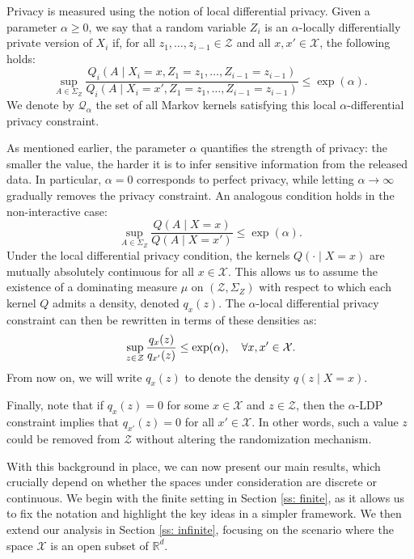 \documentclass[a4paper, 11pt]{article}
\theoremstyle{definition}
\begin{document}
{Privacy is measured using the notion of local differential privacy. Given a parameter $\alpha \ge 0$, we say that a random variable $Z_i$ is an $\alpha$-locally differentially private version of $X_i$ if, for all $z_1, \dots, z_{i-1} \in \mathcal{Z}$ and all $x, x' \in \mathcal{X}$, the following holds:
$$
\sup_{A \in \Sigma_Z} \frac{Q_i(A \mid X_i = x, Z_1 = z_1, \dots, Z_{i-1} = z_{i-1})}{Q_i(A \mid X_i = x', Z_1 = z_1, \dots, Z_{i-1} = z_{i-1})} \le \exp(\alpha).
$$
We denote by $\mathcal{Q}_\alpha$ the set of all Markov kernels satisfying this local $\alpha$-differential privacy constraint.

As mentioned earlier, the parameter $\alpha$ quantifies the strength of privacy: the smaller the value, the harder it is to infer sensitive information from the released data. In particular, $\alpha = 0$ corresponds to perfect privacy, while letting $\alpha \to \infty$ gradually removes the privacy constraint. An analogous condition holds in the non-interactive case:
$$
\sup_{A \in \Sigma_Z} \frac{Q(A \mid X = x)}{Q(A \mid X = x')} \le \exp(\alpha).
$$
Under the local differential privacy condition, the kernels $Q(\cdot \mid X = x)$ are mutually absolutely continuous for all $x \in \mathcal{X}$. This allows us to assume the existence of a dominating measure $\mu$ on $(\mathcal{Z}, \Sigma_Z)$ with respect to which each kernel $Q$ admits a density, denoted $q_x(z)$. The $\alpha$-local differential privacy constraint can then be rewritten in terms of these densities as:
\begin{equation}{\label{eq: def LDP}}
\sup_{z \in \mathcal{Z}} \frac{q_x(z)}{q_{x'}(z)} \le \exp(\alpha), \quad \forall x, x' \in \mathcal{X}.
\end{equation}
From now on, we will write $q_x(z)$ to denote the density $q(z \mid X = x)$.

Finally, note that if $q_x(z) = 0$ for some $x \in \mathcal{X}$ and $z \in \mathcal{Z}$, then the $\alpha$-LDP constraint implies that $q_{x'}(z) = 0$ for all $x' \in \mathcal{X}$. In other words, such a value $z$ could be removed from $\mathcal{Z}$ without altering the randomization mechanism.

With this background in place, we can now present our main results, which crucially depend on whether the spaces under consideration are discrete or continuous. We begin with the finite setting in Section \ref{ss: finite}, as it allows us to fix the notation and highlight the key ideas in a simpler framework. We then extend our analysis in Section \ref{ss: infinite}, focusing on the scenario where the space $\mathcal{X}$ is an open subset of $\mathbb{R}^d$. %


}
\end{document}
